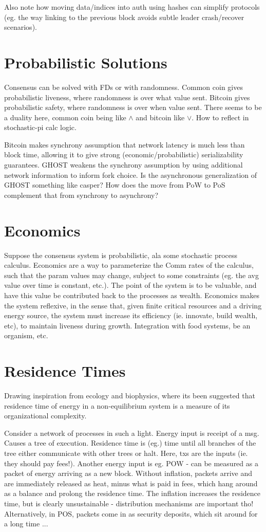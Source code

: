 Also note how moving data/indices into auth using hashes can simplify protocols
(eg. the way linking to the previous block avoids subtle leader crash/recover scenarios).

\section{Probabilistic Solutions}
Consensus can be solved with FDs or with randomness.
Common coin gives probabilistic liveness, where randomness is over what value sent.
Bitcoin gives probabilistic safety, where randomness is over when value sent.
There seems to be a duality here, common coin being like $\wedge$ and bitcoin like $\vee$.
How to reflect in stochastic-pi calc logic.

Bitcoin makes synchrony assumption that network latency is much less than block time,
allowing it to give strong (economic/probabilistic) serializability guarantees.
GHOST weakens the synchrony assumption by using additional network information to inform fork choice.
Is the asynchronous generalization of GHOST something like casper?
How does the move from PoW to PoS complement that from synchrony to asynchrony?

\section{Economics}
Suppose the consensus system is probabilistic, ala some stochastic process calculus.
Economics are a way to parameterize the Comm rates of the calculus,
such that the param values may change, subject to some constraints 
(eg. the avg value over time is constant, etc.).
The point of the system is to be valuable,
and have this value be contributed back to the processes as wealth.
Economics makes the system reflexive, in the sense that,
given finite critical resources and a driving energy source,
the system must increase its efficiency (ie. innovate, build wealth, etc),
to maintain liveness during growth.
Integration with food systems, be an organism, etc.

\section{Residence Times}
Drawing inspiration from ecology and biophysics, 
where its been suggested that residence time of energy in a non-equilibrium system is a 
measure of its organizational complexity.

Consider a network of processes in such a light.
Energy input is receipt of a msg. 
Causes a tree of execution. 
Residence time is (eg.) time until all branches of the tree either communicate with other trees or halt.
Here, txs are the inputs (ie. they should pay fees!).
Another energy input is eg. POW - can be measured as a packet of energy arriving as a new block.
Without inflation, packets arrive and are immediately released as heat, minus what is paid in fees,
which hang around as a balance and prolong the residence time.
The inflation increases the residence time, but is clearly unsustainable - distribution mechanisms are important tho!
Alternatively, in POS, packets come in as security deposits, which sit around for a long time ...
